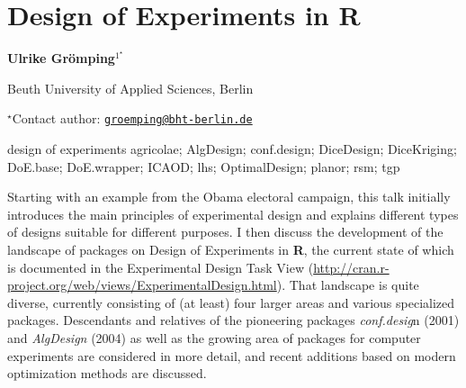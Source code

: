 \documentclass[\main/boa.tex]{subfiles}
\begin{document}
\section{Design of Experiments in R}

\begin{center}
  {\bf {} Ulrike Grömping$^{1^\star}$}
\end{center}

\vskip 0.3cm

\begin{affiliations}
\begin{enumerate}
\begin{minipage}{0.915\textwidth}
\centering
\item Beuth University of Applied Sciences, Berlin \\[-2pt]
\end{minipage}
\end{enumerate}
$^\star$Contact author: \href{mailto:groemping@bht-berlin.de}{\nolinkurl{groemping@bht-berlin.de}}\\
\end{affiliations}

\vskip 0.5cm

\begin{minipage}{0.915\textwidth}
\keywords design of experiments
\packages {} agricolae;  AlgDesign;  conf.design;  DiceDesign;  DiceKriging;  DoE.base;  DoE.wrapper;  ICAOD;  lhs;  OptimalDesign;  planor;  rsm;  tgp
\end{minipage}

\vskip 0.8cm

Starting with an example from the Obama electoral campaign, this talk 
initially introduces the main principles of experimental design and 
explains different types of designs suitable for different purposes. 
I then discuss the development of the landscape of packages on
Design of Experiments in \textbf{R}, the current state of which is
documented in the Experimental Design Task View
(\url{http://cran.r-project.org/web/views/ExperimentalDesign.html}).
That landscape is quite diverse, currently consisting of (at least) four
larger areas and various specialized packages. Descendants and relatives
of the pioneering packages \emph{conf.desig}n (2001) and
\emph{AlgDesign} (2004) as well as the growing area of packages for
computer experiments are considered in more detail, and recent additions
based on modern optimization methods are discussed.
\end{document}
